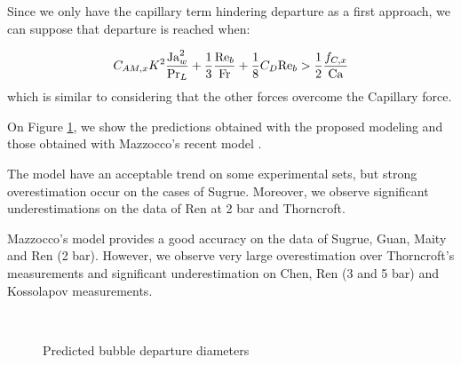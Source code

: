 Since we only have the capillary term hindering departure as a first approach, we can suppose that departure is reached when:

\begin{equation}
C_{AM,x}K^{2} \frac{\mathrm{Ja}_{w}^{2}}{\mathrm{Pr}_{L}} + \frac{1}{3}\frac{\mathrm{Re}_{b}}{\mathrm{Fr}} + \frac{1}{8}C_{D}\mathrm{Re}_{b} > \frac{1}{2} \frac{f_{C,x}}{\mathrm{Ca}}
\label{eq:pred_nogr}
\end{equation}
which is similar to considering that the other forces overcome the Capillary force.

On Figure \ref{fig:pred_nosensi}, we show the predictions obtained with the proposed modeling and those obtained with Mazzocco's recent model \cite{mazzocco_reassessed_2018}. 


The model have an acceptable trend on some experimental sets, but strong overestimation occur on the cases of Sugrue. Moreover, we observe significant underestimations on the data of Ren at 2 bar and Thorncroft.

Mazzocco's model provides a good accuracy on the data of Sugrue, Guan, Maity and Ren (2 bar). However, we observe very large overestimation over Thorncroft's measurements and significant underestimation on Chen, Ren (3 and 5 bar) and Kossolapov measurements. 




\begin{figure}[h!]
\centering
{}
\\

\caption{Predicted bubble departure diameters}
\label{fig:pred_nosensi}
\end{figure}




